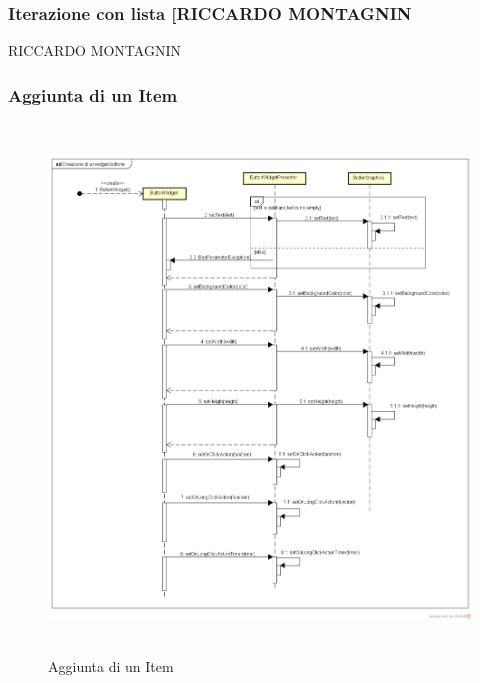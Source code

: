 \subsubsection{Iterazione con lista [RICCARDO MONTAGNIN}

RICCARDO MONTAGNIN


\subsubsection{Aggiunta di un Item}

\label{Aggiunta di un Item}
\begin{figure}[ht]
	\centering
	\includegraphics[width=16cm, height=14cm]{Sezioni/Diagrammi/img/Creazione di un widget bottone.png}
	\caption{Aggiunta di un Item}
\end{figure}

